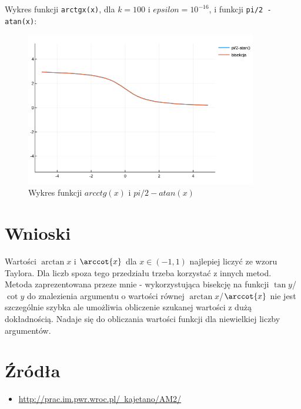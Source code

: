 \documentclass[11pt,a4paper]{article}
\begin{document}
    Wykres funkcji \verb!arctgx(x)!, dla $k=100$ i $epsilon=10^{-16}$, i  funkcji \verb!pi/2 - atan(x)!:
    \begin{figure}[h]
        \includegraphics[width=0.9\textwidth]{bisect2.png}
        \caption{Wykres funkcji $arcctg(x)$ i $pi/2-atan(x)$}
    \end{figure}

    \section{Wnioski}
    Wartości $\arctan{x}$ i $\arccot{x}$ dla $x\in(-1,1)$ najlepiej liczyć ze wzoru Taylora. Dla liczb spoza tego przedziału trzeba korzystać z innych metod. Metoda zaprezentowana przeze mnie - wykorzystująca bisekcję na funkcji $\tan{y}$/$\cot{y}$ do znalezienia argumentu o wartości równej $\arctan{x}$/$\arccot{x}$ nie jest szczególnie szybka ale umożliwia obliczenie szukanej wartości z dużą dokładnością. Nadaje się do obliczania wartości funkcji dla niewielkiej liczby argumentów.

    \section{Źródła}
    \begin{itemize}
        \item \href{http://prac.im.pwr.wroc.pl/~kajetano/AM2/}{http://prac.im.pwr.wroc.pl/~kajetano/AM2/}
    \end{itemize}
        
\end{document}
